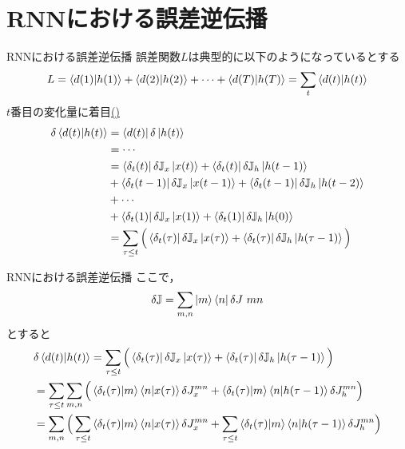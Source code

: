 \documentclass[dvipdfmx,10pt]{beamer}
\begin{document}
  \section{RNNにおける誤差逆伝播}
  \begin{frame}[label=back]{RNNにおける誤差逆伝播}
    誤差関数$L$は典型的に以下のようになっているとする
    \begin{equation*}
      L = \braket{d(1)|h(1)} + \braket{d(2)|h(2)} + \cdots + \braket{d(T)|h(T)}= \sum_{t}\braket{d(t)|h(t)}
    \end{equation*}
    $t$番目の変化量に着目\hyperlink{計算1}{()}
    \begin{align*}
      \delta \braket{d(t)|h(t)} 
      &= \bra{d(t)} \delta \ket{h(t)} \ \\
      &= \cdots\\
      &= \bra{\delta_t (t)}\delta \mathbb{J}_x \ket{x(t)} + \bra{\delta_t (t)}\delta \mathbb{J}_h \ket{h(t-1)}\\
      &+ \bra{\delta_t (t-1)}\delta \mathbb{J}_x \ket{x(t-1)} + \bra{\delta_t (t-1)}\delta \mathbb{J}_h \ket{h(t-2)}\\
      &+ \cdots\\
      &+ \bra{\delta_t (1)}\delta \mathbb{J}_x \ket{x(1)} + \bra{\delta_t (1)}\delta \mathbb{J}_h \ket{h(0)}\\
      &= \sum_{\tau \leq t} \Big(\bra{\delta_t (\tau)}\delta \mathbb{J}_x \ket{x(\tau)} + \bra{\delta_t (\tau)}\delta \mathbb{J}_h \ket{h(\tau-1)} \Big)
    \end{align*}
  \end{frame}

  \begin{frame}{RNNにおける誤差逆伝播}
    ここで，
    \begin{equation*}
      \delta \mathbb{J} = \sum_{m,n} \ket{m}\bra{n}\delta J~{mn}
    \end{equation*}
    とすると
    \begin{align*}
      &\delta \braket{d(t)|h(t)} = \sum_{\tau \leq t} \Big(\bra{\delta_t (\tau)}\delta \mathbb{J}_x \ket{x(\tau)} + \bra{\delta_t (\tau)}\delta \mathbb{J}_h \ket{h(\tau-1)} \Big)\\
      &= \sum_{\tau \leq t} \sum_{m,n} \Big( \braket{\delta_t (\tau)|m} \braket{n|x(\tau)}\delta J_x^{mn} + \braket{\delta_t (\tau)|m} \braket{n|h(\tau-1)}\delta J_h^{mn} \Big)\\
      &= \sum_{m,n} \Big( \sum_{\tau \leq t} \braket{\delta_t (\tau)|m} \braket{n|x(\tau)}\delta J_x^{mn} + \sum_{\tau \leq t} \braket{\delta_t (\tau)|m} \braket{n|h(\tau-1)}\delta J_h^{mn} \Big)
    \end{align*}
  \end{frame}
\end{document}

